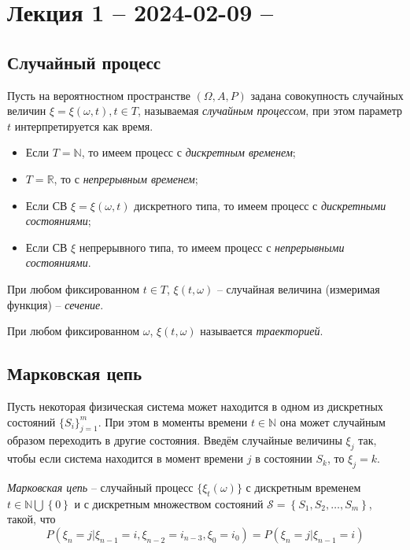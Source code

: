 \section{Лекция 1 -- 2024-02-09 -- }

\subsection{Случайный процесс}

\begin{definition}
  Пусть на вероятностном пространстве $(\Omega, A, P)$ задана совокупность случайных величин
  $\xi = \xi(\omega, t), t \in T$, называемая \emph{случайным процессом}, при этом параметр 
  $t$ интерпретируется как время.

  \begin{itemize}
    \item Если $T = \mathbb{N}$, то имеем процесс с \emph{дискретным временем};
    \item $T = \mathbb{R}$, то с \emph{непрерывным временем};
    \item Если СВ $\xi=\xi(\omega, t)$ дискретного типа, то имеем процесс с \emph{дискретными состояниями};
    \item Если СВ $\xi$ непрерывного типа, то имеем процесс с \emph{непрерывными состояниями}.
  \end{itemize}

  При любом фиксированном $t \in T$, $\xi(t, \omega)$ -- случайная величина (измеримая функция)
  -- \emph{сечение}.

  При любом фиксированном $\omega$, $\xi(t, \omega)$ называется \emph{траекторией}.
\end{definition}


\subsection{Марковская цепь}

\begin{definition}
  Пусть некоторая физическая система может находится в одном из дискретных состояний
  $\{S_i\}_{j=1}^m$. При этом в моменты времени $t \in \mathbb{N}$ она может случайным образом
  переходить в другие состояния. Введём случайные величины $\xi_j$ так, чтобы если система
  находится в момент времени $j$ в состоянии $S_k$, то $\xi_j = k$.

  \emph{Марковская цепь} -- случайный процесс $\{\xi_t(\omega)\}$ с дискретным временем
  $t \in \mathbb{N} \bigcup \left\{ 0 \right\} $ и с дискретным множеством состояний
  $\mathcal{S} = \left\{ S_1, S_2, \dots, S_m \right\} $, такой, что
  \[
    P(\xi_n = j | \xi_{n-1} = i, \xi_{n-2} = i_{n-3}, \xi_0 = i_0) = P(\xi_n=j | \xi_{n-1} = i)
  \]
\end{definition}

